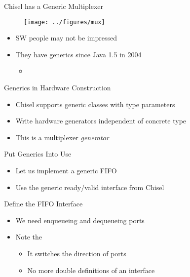 \begin{frame}[fragile]{Chisel has a Generic Multiplexer}
\begin{figure}
  \texttt{[image: ../figures/mux]}
\end{figure}
\begin{itemize}
\item SW people may not be impressed
\item They have generics since Java 1.5 in 2004
\begin{itemize}
\item {}
\end{itemize}
\end{itemize}
\end{frame}


\begin{frame}[fragile]{Generics in Hardware Construction}
\begin{itemize}
\item Chisel supports generic classes with type parameters
\item Write hardware generators independent of concrete type
\item This is a multiplexer \emph{generator}
\end{itemize}
\end{frame}

\begin{frame}[fragile]{Put Generics Into Use}
\begin{itemize}
\item Let us implement a generic FIFO
\item Use the generic ready/valid interface from Chisel
\end{itemize}
\end{frame}

\begin{frame}[fragile]{Define the FIFO Interface}
\begin{itemize}
\item We need enqueueing and dequeueing ports
\item Note the 
\begin{itemize}
\item It switches the direction of ports
\item No more double definitions of an interface
\end{itemize}
\end{itemize}
\end{frame}

